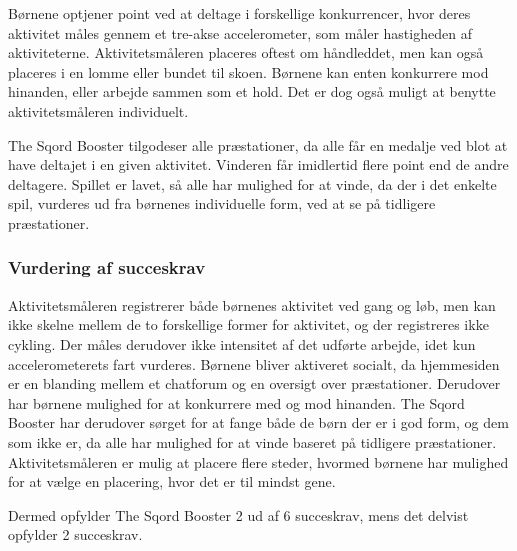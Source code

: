 Børnene optjener point ved at deltage i forskellige konkurrencer, hvor deres aktivitet måles gennem et tre-akse accelerometer, som måler hastigheden af aktiviteterne. Aktivitetsmåleren placeres oftest om håndleddet, men kan også placeres i en lomme eller bundet til skoen. \citep{Sqord_family2015} \newline Børnene kan enten konkurrere mod hinanden, eller arbejde sammen som et hold. Det er dog også muligt at benytte aktivitetsmåleren individuelt. \citep{Sqord_family2015,Sqord_group2015} \newline

The Sqord Booster tilgodeser alle præstationer, da alle får en medalje ved blot at have deltajet i en given aktivitet. Vinderen får imidlertid flere point end de andre deltagere. Spillet er lavet, så alle har mulighed for at vinde, da der i det enkelte spil, vurderes ud fra børnenes individuelle form, ved at se på tidligere præstationer. \citep{Sqord_family2015}

\subsubsection{Vurdering af succeskrav}
Aktivitetsmåleren registrerer både børnenes aktivitet ved gang og løb, men kan ikke skelne mellem de to forskellige former for aktivitet, og der registreres ikke cykling. Der måles derudover ikke intensitet af det udførte arbejde, idet kun accelerometerets fart vurderes. \newline
Børnene bliver aktiveret socialt, da hjemmesiden er en blanding mellem et chatforum og en oversigt over præstationer. Derudover har børnene mulighed for at konkurrere med og mod hinanden. The Sqord Booster har derudover sørget for at fange både de børn der er i god form, og dem som ikke er, da alle har mulighed for at vinde baseret på tidligere præstationer. Aktivitetsmåleren er mulig at placere flere steder, hvormed børnene har mulighed for at vælge en placering, hvor det er til mindst gene.

Dermed opfylder The Sqord Booster 2 ud af 6 succeskrav, mens det delvist opfylder 2 succeskrav.

